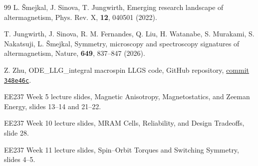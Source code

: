 \begin{thebibliography}{99}
L. \v{S}mejkal, J. Sinova, T. Jungwirth,
Emerging research landscape of altermagnetism,
Phys. Rev. X, \textbf{12}, 040501 (2022).

T. Jungwirth, J. Sinova, R. M. Fernandes, Q. Liu, H. Watanabe, S. Murakami,
S. Nakatsuji, L. \v{S}mejkal,
Symmetry, microscopy and spectroscopy signatures of altermagnetism,
Nature, \textbf{649}, 837--847 (2026).

Z. Zhu,
ODE\_LLG\_integral macrospin LLGS code,
GitHub repository,
\href{https://github.com/zhuzibn/ODE_LLG_integral/tree/348e46ce40439b9617168f24319c7dd058948df6}%
{commit \texttt{348e46c}}.

EE237 Week 5 lecture slides,
Magnetic Anisotropy, Magnetostatics, and Zeeman Energy,
slides 13--14 and 21--22.

EE237 Week 10 lecture slides,
MRAM Cells, Reliability, and Design Tradeoffs,
slide 28.

EE237 Week 11 lecture slides,
Spin--Orbit Torques and Switching Symmetry,
slides 4--5.

\end{thebibliography}
